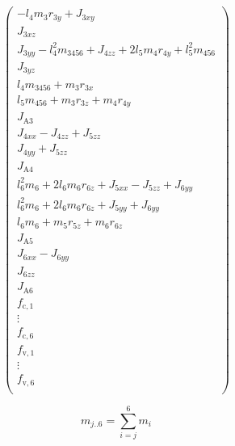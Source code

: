 {\begin{equation}
\begin{pmatrix}
			-l_4 m_3 r_{3y} + J_{3xy} \\
			J_{3xz} \\
			J_{3yy} - l_4^2 m_{3456} + J_{4zz} + 2l_5 m_4 r_{4y} + l_5^2 m_{456} \\
			J_{3yz} \\
			l_4 m_{3456} + m_3 r_{3x} \\
			l_5 m_{456} + m_3 r_{3z} + m_4 r_{4y} \\
			J_{\text{A}3} \\
			J_{4xx} - J_{4zz} + J_{5zz} \\
			J_{4yy} + J_{5zz} \\
			J_{\text{A}4} \\
			l_6^2 m_6 + 2 l_6 m_6 r_{6z} + J_{5xx} - J_{5zz} + J_{6yy} \\
			l_6^2 m_6 + 2 l_6 m_6 r_{6z} + J_{5yy} + J_{6yy} \\
			l_6 m_6 + m_5 r_{5z} + m_6 r_{6z} \\
			J_{\text{A}5} \\
			J_{6xx} - J_{6yy} \\
			J_{6zz} \\
			J_{\text{A}6} \\
			
			f_{\mathrm{c},1} \\
			\vdots \\
			f_{\mathrm{c},6} \\
			
			f_{\mathrm{v},1} \\
            \vdots \\
			f_{\mathrm{v},6} \\
		\end{pmatrix}
\end{equation}
}


\begin{equation}
\label{eq:MassenSumme}
    m_{j..6}=\sum_{i=j}^{6} m_i
\end{equation}